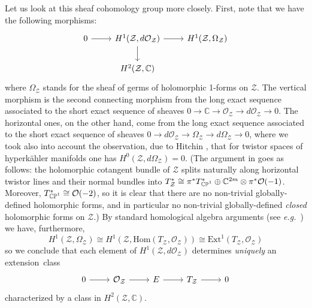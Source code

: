 \documentclass[11pt]{amsart}
\theoremstyle{remark}
\theoremstyle{remark}
\theoremstyle{definition}
\theoremstyle{definition}
\theoremstyle{definition}
\newcommand{\0}{{\scriptstyle 0'}} %
\newcommand{\1}{{\scriptstyle 1'}}
\newcommand{\hp}{\hspace{0.5pt}} %
\newcommand{\Hom}{\text{Hom}}
\newcommand{\Ext}{\text{Ext}}
\begin{document}
Let us look at this sheaf cohomology group more closely. First, note that we have the following morphisms:
\begin{equation}
\begin{tikzcd}
0 \rar & H^1(\mathcal{Z},d\mathcal{O}_{\mathcal{Z}}) \dar \rar & H^1(\mathcal{Z},\Omega_{\mathcal{Z}})  \\
& H^2(\mathcal{Z},\mathbb{C}) &
\end{tikzcd}
\end{equation}
where $\Omega_{\mathcal{Z}}$ stands for the sheaf of germs of holomorphic 1-forms on $\mathcal{Z}$. The vertical morphism is the second connecting morphism from the long exact sequence associated to the short exact sequence of sheaves
$0 \longrightarrow \mathbb{C} \longrightarrow \mathcal{O}_{\mathcal{Z}} \longrightarrow d\mathcal{O}_{\mathcal{Z}} \longrightarrow 0$.
The horizontal ones, on the other hand, come from the long exact sequence associated to the short exact sequence of sheaves
$0 \longrightarrow d\mathcal{O}_{\mathcal{Z}} \longrightarrow \Omega_{\mathcal{Z}} \longrightarrow d\Omega_{\mathcal{Z}} \longrightarrow 0$,
where we took also into account the observation, due to Hitchin \cite{MR3116317}, that for twistor spaces of hyperk\"ahler manifolds one has $H^0(\mathcal{Z},d\Omega_{\mathcal{Z}}) = 0$. (The argument in \cite{MR3116317} goes as follows: the holomorphic cotangent bundle of $\mathcal{Z}$ splits naturally along horizontal twistor lines and their normal bundles into \mbox{$T_{\mathcal{Z}}^* \cong \pi^* T^*_{\hp\smash{\mathbb{CP}^1}} \oplus \mathbb{C}^{2m} \otimes \pi^*\mathcal{O}(-1)$}. Moreover, $T^*_{\hp\smash{\mathbb{CP}^1}} \cong \mathcal{O}(-2)$, so it is clear that there are no non-trivial globally-defined holomorphic forms, and in particular no non-trivial globally-defined \textit{closed} holomorphic forms on $\mathcal{Z}$.) By standard homological algebra arguments (see \textit{e.g.}~\cite{MR0086359}) we have, furthermore,
\begin{equation}
H^1(\mathcal{Z},\Omega_{\mathcal{Z}}) \cong H^1(\mathcal{Z},\Hom(T_{\mathcal{Z}},\mathcal{O}_{\mathcal{Z}})) \cong \Ext^1(T_{\mathcal{Z}},\mathcal{O}_{\mathcal{Z}})
\end{equation}
so we conclude that each element of $H^1(\mathcal{Z},d\mathcal{O}_{\mathcal{Z}})$ determines \textit{uniquely} an extension~class
\begin{equation} \label{Atiyah_seq}
\begin{tikzcd}
0 \rar & \mathcal{O}_{\mathcal{Z}} \rar & E \rar & T_{\mathcal{Z}} \rar & 0
\end{tikzcd}
\end{equation}
characterized by a  class in $H^2(\mathcal{Z},\mathbb{C})$. 
\end{document}
